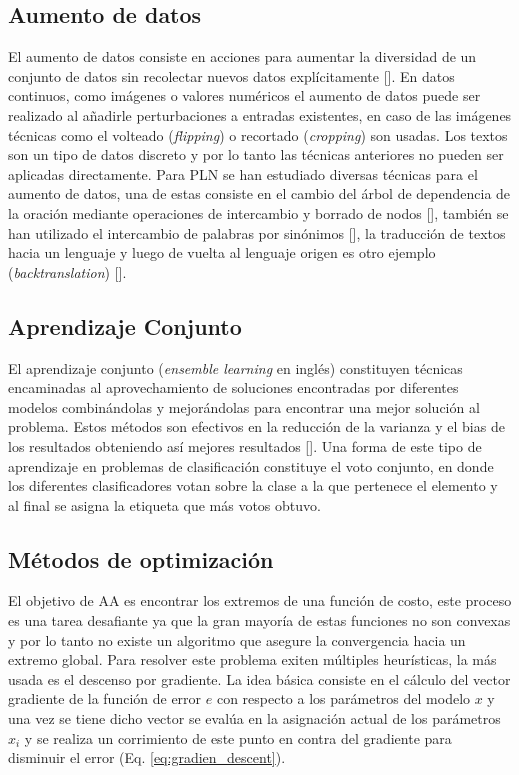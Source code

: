 \subsection{Aumento de datos}

El aumento de datos consiste en acciones para aumentar la diversidad de un conjunto de datos sin recolectar
nuevos datos explícitamente [\cite{feng2021data}]. En datos continuos, como imágenes o valores numéricos el 
aumento de datos puede ser realizado al añadirle perturbaciones a entradas existentes, en caso de las imágenes 
técnicas como el volteado (\emph{flipping}) o recortado (\emph{cropping}) son usadas. Los textos son un tipo 
de datos discreto y por lo tanto las técnicas anteriores no pueden ser aplicadas directamente. Para PLN
se han estudiado diversas técnicas para el aumento de datos, una de estas consiste en el cambio del árbol de 
dependencia de la oración mediante operaciones de intercambio y borrado de nodos [\cite{csahin2019data}], también se han utilizado 
el intercambio de palabras por sinónimos [\cite{dai2020analysis}], la traducción de textos hacia un lenguaje y luego 
de vuelta al lenguaje origen es otro ejemplo (\emph{backtranslation}) [\cite{sennrich2015improving}]. 

\subsection{Aprendizaje Conjunto}

El aprendizaje conjunto (\emph{ensemble learning} en inglés) constituyen técnicas encaminadas al aprovechamiento
de soluciones encontradas por diferentes modelos combinándolas y mejorándolas para encontrar una mejor solución 
al problema. Estos métodos son efectivos en la reducción de la varianza y el bias de los resultados obteniendo así
mejores resultados [\cite{dietterich2002ensemble}]. Una forma de este tipo de aprendizaje en problemas de 
clasificación constituye el voto conjunto, en donde los diferentes clasificadores votan sobre la clase a la que 
pertenece el elemento y al final se asigna la etiqueta que más votos obtuvo.

\subsection{Métodos de optimización}

El objetivo de AA es encontrar los extremos de una función de costo, este proceso es una tarea 
desafiante ya que la gran mayoría de estas funciones no son convexas y por lo tanto no existe un algoritmo
que asegure la convergencia hacia un extremo global. Para resolver este problema exiten múltiples heurísticas,
la más usada es el descenso por gradiente. La idea básica consiste 
en el cálculo del vector gradiente de la función de error $e$ con respecto a los parámetros del modelo $x$ y una vez se 
tiene dicho vector se evalúa en la asignación actual de los parámetros $x_i$ y se realiza un corrimiento de este punto 
en contra del gradiente para disminuir el error (Eq. \ref{eq:gradien_descent}).

